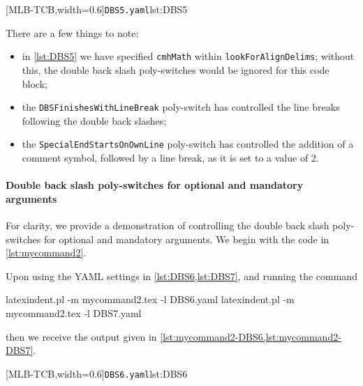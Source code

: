 		\begin{cmhtcbraster}[
				raster force size=false,
				raster column 1/.style={add to width=-.1\textwidth},
				raster column skip=.06\linewidth]
			[MLB-TCB,width=0.6\textwidth]{\texttt{DBS5.yaml}}{lst:DBS5}
		\end{cmhtcbraster}

		There are a few things to note:
		\begin{itemize}
			\item in \cref{lst:DBS5} we have specified \texttt{cmhMath} within \texttt{lookForAlignDelims};
			      without this, the double back slash poly-switches would be ignored for this code block;
			\item the \texttt{DBSFinishesWithLineBreak} poly-switch has controlled the line breaks
			      following the double back slashes;
			\item the \texttt{SpecialEndStartsOnOwnLine} poly-switch has controlled the addition of a
			      comment symbol, followed by a line break, as it is set to a value of 2.
		\end{itemize}

	\paragraph{Double back slash poly-switches for optional and mandatory arguments}
		For clarity, we provide a demonstration of controlling the double back slash
		poly-switches for optional and mandatory arguments. We begin with the code in
		\cref{lst:mycommand2}.


		Upon using the YAML settings in \cref{lst:DBS6,lst:DBS7}, and running the command
		\begin{commandshell}
latexindent.pl -m mycommand2.tex -l DBS6.yaml
latexindent.pl -m mycommand2.tex -l DBS7.yaml
\end{commandshell}
		then we receive the output given in \cref{lst:mycommand2-DBS6,lst:mycommand2-DBS7}.

		\begin{cmhtcbraster}[
				raster force size=false,
				raster column 1/.style={add to width=-.1\textwidth},
				raster column skip=.03\linewidth]
			[MLB-TCB,width=0.6\textwidth]{\texttt{DBS6.yaml}}{lst:DBS6}
		\end{cmhtcbraster}

